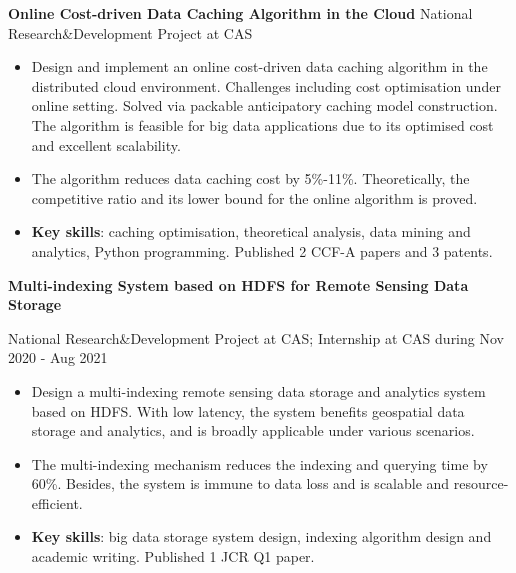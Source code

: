 \documentclass[letterpaper,10.9pt]{article}
\begin{document}
\vspace{1pt}

\textbf{Online Cost-driven Data Caching Algorithm in the Cloud} \hfill National Research\&Development Project at CAS

\begin{itemize}
  \setlength\itemsep{1.8pt}
  \item Design and implement an online cost-driven data caching algorithm in the distributed cloud environment. Challenges including cost optimisation under online setting. Solved via packable anticipatory caching model construction. The algorithm is feasible for big data applications due to its optimised cost and excellent scalability. 
  \item The algorithm reduces data caching cost by 5\%-11\%. Theoretically, the competitive ratio and its lower bound for the online algorithm is proved. 
  \item \textbf{Key skills}: caching optimisation, theoretical analysis, data mining and analytics, Python programming. Published 2 CCF-A papers and 3 patents. 
\end{itemize}

\vspace{1pt}

\textbf{Multi-indexing System based on HDFS for Remote Sensing Data Storage}

National Research\&Development Project at CAS; Internship at CAS during Nov 2020 - Aug 2021

\begin{itemize}
  \setlength\itemsep{1.8pt}
  \item Design a multi-indexing remote sensing data storage and analytics system based on HDFS. With low latency, the system benefits geospatial data storage and analytics, and is broadly applicable under various scenarios. 
  \item The multi-indexing mechanism reduces the indexing and querying time by 60\%. Besides, the system is immune to data loss and is scalable and resource-efficient.
  \item \textbf{Key skills}: big data storage system design, indexing algorithm design and academic writing. Published 1 JCR Q1 paper. 
\end{itemize}



\end{document}
